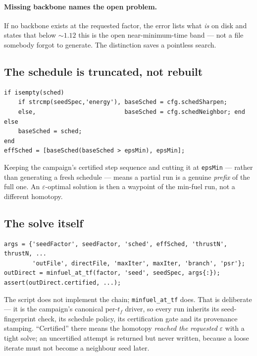 \documentclass[11pt]{article}
\newcommand{\file}[1]{\texttt{#1}}
\begin{document}
\paragraph{Missing backbone names the open problem.} If no backbone exists at
the requested factor, the error lists what \emph{is} on disk and states that
below ${\sim}1.12$ this is the open near-minimum-time band --- not a file
somebody forgot to generate. The distinction saves a pointless search.

\subsection{The schedule is truncated, not rebuilt}

\begin{lstlisting}
if isempty(sched)
    if strcmp(seedSpec,'energy'), baseSched = cfg.schedSharpen;
    else,                         baseSched = cfg.schedNeighbor; end
else
    baseSched = sched;
end
effSched = [baseSched(baseSched > epsMin), epsMin];
\end{lstlisting}

Keeping the campaign's certified step sequence and cutting it at
\texttt{epsMin} --- rather than generating a fresh schedule --- means a partial
run is a genuine \emph{prefix} of the full one. An $\varepsilon$-optimal
solution is then a waypoint of the min-fuel run, not a different homotopy.

\subsection{The solve itself}

\begin{lstlisting}
args = {'seedFactor', seedFactor, 'sched', effSched, 'thrustN', thrustN, ...
        'outFile', directFile, 'maxIter', maxIter, 'branch', 'psr'};
outDirect = minfuel_at_tf(factor, 'seed', seedSpec, args{:});
assert(outDirect.certified, ...);
\end{lstlisting}

The script does not implement the chain; \file{minfuel\_at\_tf} does. That is
deliberate --- it is the campaign's canonical per-$t_f$ driver, so every run
inherits its seed-fingerprint check, its schedule policy, its certification gate
and its provenance stamping. ``Certified'' there means the homotopy \emph{reached
the requested} $\varepsilon$ with a tight solve; an uncertified attempt is
returned but never written, because a loose iterate must not become a neighbour
seed later.
\end{document}
